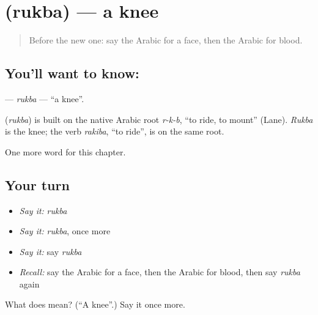 \section[\texorpdfstring{\ar{ركبة} (rukba)}{ركبة (rukba)}]{ (rukba) — a knee}

\label{lesson:AR-C52-rukba}



\begin{quote}
Before the new one: say the Arabic for a face, then the Arabic for blood.
\end{quote}

\subsection*{You'll want to know: }
\textbf{} — \emph{rukba} — \textquotedblleft{}a knee\textquotedblright{}.

\begin{cousinweb}
\textbf{} (\emph{rukba}) is built on the native Arabic root \emph{r-k-b}, \textquotedblleft{}to ride, to mount\textquotedblright{} (Lane). \emph{Rukba} is the knee; the verb \emph{rakiba}, \textquotedblleft{}to ride\textquotedblright{}, is on the same root.
\end{cousinweb}

\begin{grammarlens}[title={What you've built}]
One more word for this chapter.
\end{grammarlens}

\subsection*{Your turn}
\begin{itemize}
\raggedright
  \item \emph{Say it:} \emph{rukba}
  \item \emph{Say it:} \emph{rukba}, once more
  \item \emph{Say it:} say \emph{rukba}
  \item \emph{Recall:} say the Arabic for a face, then the Arabic for blood, then say \emph{rukba} again
\end{itemize}

\begin{tcolorbox}[breakable,colback=teal!4,colframe=teal!35!black,title={Before you move on}]
What does  mean? (\textquotedblleft{}A knee\textquotedblright{}.) Say it once more.
\end{tcolorbox}
